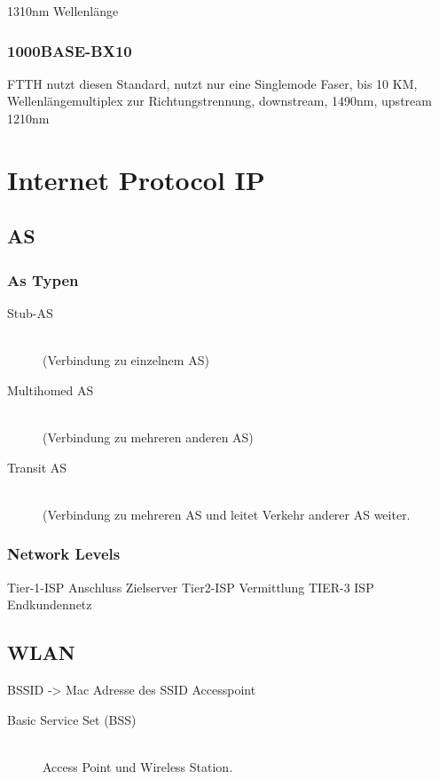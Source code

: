 \begin{multicols}{2}
	1310nm Wellenlänge

\subsubsection{1000BASE-BX10}

FTTH nutzt diesen Standard, nutzt nur eine Singlemode Faser, bis 10 KM, Wellenlängemultiplex zur Richtungstrennung, downstream, 1490nm, upstream 1210nm
 
 
 \section{Internet Protocol IP}
 
 \subsection{AS}

 \subsubsection{As Typen}
 \begin{description}
	 \item[Stub-AS] \hfill \\
	 	 (Verbindung zu einzelnem AS)
	 \item[Multihomed AS] \hfill \\
		 (Verbindung zu mehreren anderen AS)
	 \item[Transit AS] \hfill \\
		 (Verbindung zu mehreren AS und leitet Verkehr anderer AS weiter.	
 \end{description}
 
 \subsubsection{Network Levels}
 Tier-1-ISP Anschluss Zielserver
 Tier2-ISP Vermittlung
 TIER-3 ISP Endkundennetz
 
 
\subsection{WLAN}
	
	BSSID -> Mac Adresse des SSID Accesspoint
	
	\begin{description}
		\item[Basic Service Set (BSS)] \hfill \\
		 Access Point und Wireless Station.
		 

\end{description}
\end{multicols}
